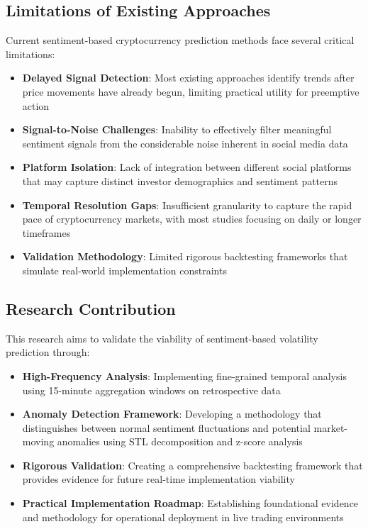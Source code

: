 \documentclass[11pt,twocolumn]{article}
\begin{document}
\subsection{\textbf{Limitations of Existing Approaches}}
Current sentiment-based cryptocurrency prediction methods face several critical limitations:
\begin{itemize}
\item \textbf{Delayed Signal Detection}: Most existing approaches identify trends after price movements have already begun, limiting practical utility for preemptive action
\item \textbf{Signal-to-Noise Challenges}: Inability to effectively filter meaningful sentiment signals from the considerable noise inherent in social media data
\item \textbf{Platform Isolation}: Lack of integration between different social platforms that may capture distinct investor demographics and sentiment patterns
\item \textbf{Temporal Resolution Gaps}: Insufficient granularity to capture the rapid pace of cryptocurrency markets, with most studies focusing on daily or longer timeframes
\item \textbf{Validation Methodology}: Limited rigorous backtesting frameworks that simulate real-world implementation constraints
\end{itemize}

\subsection{\textbf{Research Contribution}}
This research aims to validate the viability of sentiment-based volatility prediction through:
\begin{itemize}
\item \textbf{High-Frequency Analysis}: Implementing fine-grained temporal analysis using 15-minute aggregation windows on retrospective data
\item \textbf{Anomaly Detection Framework}: Developing a methodology that distinguishes between normal sentiment fluctuations and potential market-moving anomalies using STL decomposition and z-score analysis
\item \textbf{Rigorous Validation}: Creating a comprehensive backtesting framework that provides evidence for future real-time implementation viability
\item \textbf{Practical Implementation Roadmap}: Establishing foundational evidence and methodology for operational deployment in live trading environments
\end{itemize}
\end{document}
